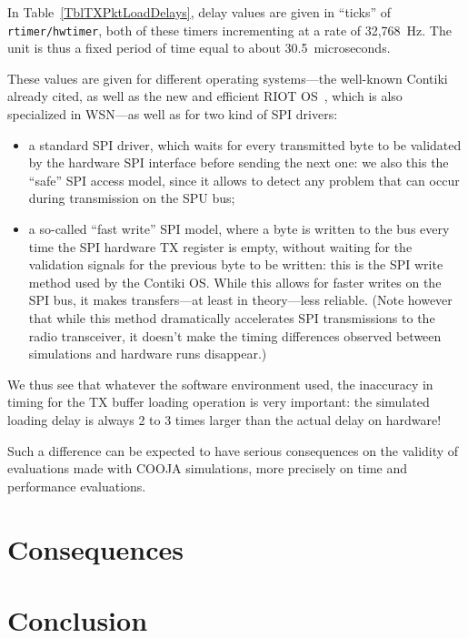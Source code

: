 \documentclass[a4paper,10pt]{article}
\begin{document}
In Table~\ref{TblTXPktLoadDelays}, delay values are given in ``ticks'' of
\texttt{rtimer/hwtimer}, both of these timers incrementing at a rate of
32,768~Hz. The unit is thus a fixed period of time equal to about
30.5~microseconds.

These values are given for different operating systems---the well-known
Contiki already cited, as well as the new and efficient RIOT OS~\cite{RIOT},
which is also specialized in WSN---as well as for two kind of SPI drivers:
\begin{itemize}
\item a standard SPI driver, which waits for every transmitted byte to be
validated by the hardware SPI interface before sending the next one:
we also this the ``safe'' SPI access model, since it allows to detect
any problem that can occur during transmission on the SPU bus;
\item a so-called ``fast write'' SPI model, where a byte is written to
the bus every time the SPI hardware TX register is empty, without waiting
for the validation signals for the previous byte to be written: this is
the SPI write method used by the Contiki OS. While this allows for faster
writes on the SPI bus, it makes transfers---at least in theory---less
reliable. (Note however that while this method dramatically accelerates
SPI transmissions to the radio transceiver, it doesn't make the timing
differences observed between simulations and hardware runs disappear.)
\end{itemize}

We thus see that whatever the software environment used, the inaccuracy
in timing for the TX buffer loading operation is very important:
the simulated loading delay is always 2 to 3 times larger than
the actual delay on hardware!

Such a difference can be expected to have serious consequences on
the validity of evaluations made with COOJA simulations, more precisely
on time and performance evaluations.


\section{Consequences}





\section{Conclusion}




\vfill

{\small
}
\end{document}
